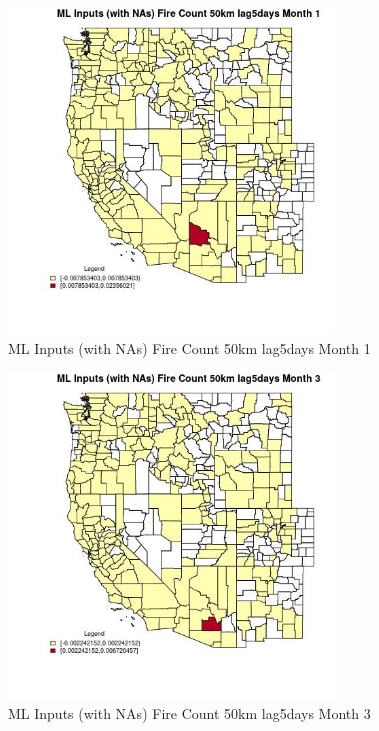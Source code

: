 \begin{figure} 
\centering  
\includegraphics[width=0.77\textwidth]{Code_Outputs/Report_ML_input_PM25_Step4_part_e_de_duplicated_aves_compiled_2019-05-20wNAs_CountyFire_Count_50km_lag5daysmedianMonth1.jpg} 
\caption{\label{fig:Report_ML_input_PM25_Step4_part_e_de_duplicated_aves_compiled_2019-05-20wNAsCountyFire_Count_50km_lag5daysmedianMonth1}ML Inputs (with NAs) Fire Count 50km lag5days Month 1} 
\end{figure} 
 

\begin{figure} 
\centering  
\includegraphics[width=0.77\textwidth]{Code_Outputs/Report_ML_input_PM25_Step4_part_e_de_duplicated_aves_compiled_2019-05-20wNAs_CountyFire_Count_50km_lag5daysmedianMonth3.jpg} 
\caption{\label{fig:Report_ML_input_PM25_Step4_part_e_de_duplicated_aves_compiled_2019-05-20wNAsCountyFire_Count_50km_lag5daysmedianMonth3}ML Inputs (with NAs) Fire Count 50km lag5days Month 3} 
\end{figure} 
 

